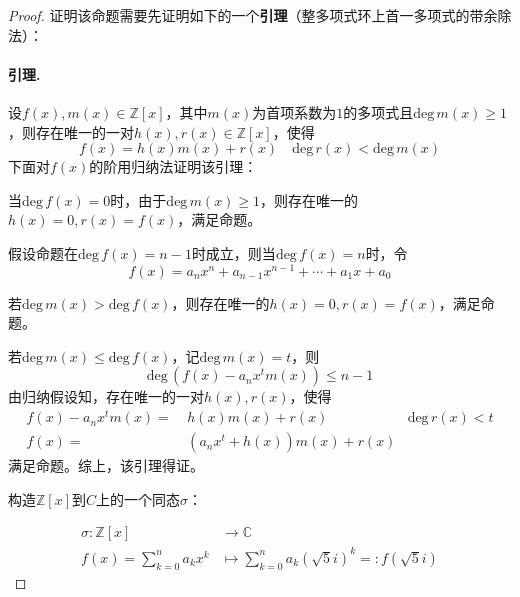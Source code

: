 \documentclass[12pt, a4paper, oneside]{ctexart}
\begin{document}
\begin{proof}
    证明该命题需要先证明如下的一个\textbf{引理}（整多项式环上首一多项式的带余除法）：
    \paragraph{引理.}设$f(x),m(x)\in\mathbb{Z}[x]$，其中$m(x)$为首项系数为$1$的多项式且$\text{deg}\,m(x)\geqslant 1$，则存在唯一的一对$h(x),r(x)\in\mathbb{Z}[x]$，使得
    \begin{equation*}
        f(x)=h(x)m(x)+r(x)\quad\text{deg}\,r(x) < \text{deg}\,m(x)
    \end{equation*}
    下面对$f(x)$的阶用归纳法证明该引理：

    当$\text{deg}\,f(x)=0$时，由于$\text{deg}\,m(x) \geqslant 1$，则存在唯一的$h(x)=0,r(x)=f(x)$，满足命题。

    假设命题在$\text{deg}\,f(x)=n-1$时成立，则当$\text{deg}\,f(x)=n$时，令
    \begin{equation*}
        f(x)=a_nx^n+a_{n-1}x^{n-1}+\cdots+a_1x+a_0
    \end{equation*}

    若$\text{deg}\,m(x) > \text{deg}\,f(x)$，则存在唯一的$h(x) = 0,r(x)=f(x)$，满足命题。

    若$\text{deg}\,m(x)\leqslant \text{deg}\,f(x)$，记$\text{deg}\,m(x) = t$，则
    \begin{equation*}
        \text{deg}\,(f(x)-a_nx^tm(x))\leqslant n-1
    \end{equation*}
    由归纳假设知，存在唯一的一对$h(x),r(x)$，使得
    \begin{equation*}
        \begin{aligned}
            f(x)-a_nx^tm(x)=&\ h(x)m(x)+r(x)&\text{deg}\,r(x) < t\\
            f(x)=&\ (a_nx^t+h(x))m(x)+r(x)
        \end{aligned}
    \end{equation*}
    满足命题。综上，该引理得证。

    构造$\mathbb{Z}[x]$到$C$上的一个同态$\sigma$：

    \begin{equation*}
        \begin{aligned}
            \sigma:\mathbb{Z}[x]&\rightarrow \mathbb{C}\\
            f(x)=\sum_{k=0}^na_kx^k&\mapsto\sum_{k=0}^na_k(\sqrt{5}i)^k=:f(\sqrt{5}i)
        \end{aligned}
    \end{equation*}


\end{proof}
\end{document}
